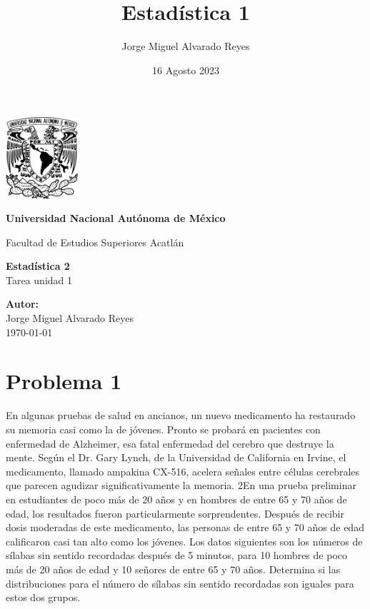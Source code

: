 \documentclass{article}
\title{Estadística 1}
\author{Jorge Miguel Alvarado Reyes}
\date{16 Agosto 2023}
\begin{document}
\begin{titlepage}
    \begin{center}
        \includegraphics[width=0.2\textwidth]{../../unam.png}
        \vspace*{.5cm}

        \LARGE
        \textbf{Universidad Nacional Autónoma de México}

        \vspace{0.5cm}
        \LARGE
        Facultad de Estudios Superiores Acatlán

        \vspace{2cm}

        \textbf{Estadística 2} \\
        Tarea unidad 1

        \vfill

        \vspace{1cm}

        \textbf{\large Autor:} \\
        Jorge Miguel Alvarado Reyes \\
        \vspace{.5cm}
        \normalsize \today

    \end{center}
\end{titlepage}
\newpage

\tableofcontents

\newpage

\section{Problema 1}
En algunas pruebas de salud en ancianos, un nuevo medicamento ha restaurado su memoria casi como la de jóvenes. Pronto se probará en pacientes con enfermedad de Alzheimer, esa fatal enfermedad del cerebro que destruye la mente. Según el Dr. Gary Lynch, de la Universidad de California en Irvine, el medicamento, llamado ampakina CX-516, acelera señales entre células cerebrales que parecen agudizar significativamente la memoria. 2En una prueba preliminar en estudiantes de poco más de 20 años y en hombres de entre 65 y 70 años de edad, los resultados fueron particularmente sorprendentes. Después de recibir dosis moderadas de este medicamento, las personas de entre 65 y 70 años de edad calificaron casi tan alto como los jóvenes. Los datos siguientes son los números de sílabas sin sentido recordadas después de 5 minutos, para 10 hombres de poco más de 20 años de edad y 10 señores de entre 65 y 70 años. Determina si las distribuciones para el número de sílabas sin sentido recordadas son iguales para estos dos grupos.
\end{document}
